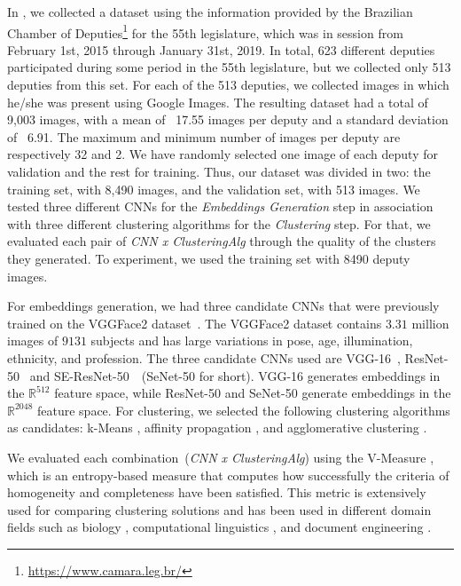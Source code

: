 In \cite{mendes2020cluster}, we collected a dataset using the information provided by the Brazilian Chamber of Deputies\footnote{\url{https://www.camara.leg.br/}} for the 55th legislature, which was in session from February 1st, 2015 through January 31st, 2019.
In total, 623 different deputies participated during some period in the 55th legislature, but we collected only 513 deputies from this set.
For each of the 513 deputies, we collected images in which he/she was present using Google Images.
The resulting dataset had a total of 9,003 images, with a mean of ~17.55 images per deputy and a standard deviation of ~6.91. 
The maximum and minimum number of images per deputy are respectively 32 and 2.
We have randomly selected one image of each deputy for validation and the rest for training.
Thus, our dataset was divided in two: the training set, with 8,490 images, and the validation set, with 513 images.  
We tested three different CNNs for the \emph{Embeddings Generation} step in association with three different clustering algorithms for the \emph{Clustering} step.
For that, we evaluated each pair of \emph{CNN x ClusteringAlg} through the quality of the clusters they generated. 
To experiment, we used the training set with 8490 deputy images.

For embeddings generation, we had three candidate CNNs that were previously trained on the VGGFace2 dataset~\cite{cao2018vggface2}. 
The VGGFace2 dataset contains $3.31$ million images of $9131$ subjects and has large variations in pose, age, illumination, ethnicity, and profession.
The three candidate CNNs used are VGG-16~\cite{vgg16}, ResNet-50~\cite{resnet} and SE-ResNet-50~\cite{senet}~(SeNet-50 for short). VGG-16 generates embeddings in the $\mathbb{R}^{512}$  feature space, while ResNet-50 and SeNet-50 generate embeddings in the $\mathbb{R}^{2048}$ feature space.  
For clustering, we selected the following clustering algorithms as candidates: k-Means \cite{lloyd1982least}, affinity propagation \cite{frey2007clustering}, and agglomerative clustering \cite{ward1963hierarchical}.


We evaluated each combination~(\emph{CNN x ClusteringAlg}) using the V-Measure \cite{vmeasure}, which is an entropy-based measure that computes how successfully the criteria of homogeneity and completeness have been satisfied. This metric is extensively used for comparing clustering solutions and has been used in different domain fields such as biology \cite{bio1}, computational linguistics \cite{nlp1}, and document engineering \cite{doceng}.

